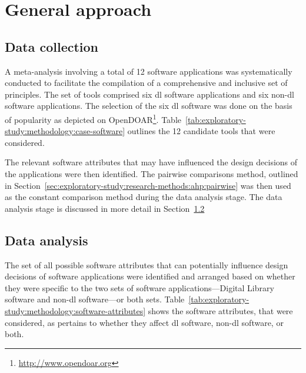 \section{General approach}
\label{sec:exploratory-study:methodology}

\subsection{Data collection}
\label{sec:exploratory-study:methodology:case-software-tools}

A meta-analysis involving a total of 12 software applications
was systematically conducted to facilitate the compilation of a comprehensive
and inclusive set of principles. The set of tools comprised six
\gls{dl} software applications and six non-\gls{dl}
software applications. The selection of the six \gls{dl} software
was done on the basis of popularity as depicted on
OpenDOAR\footnote{\url{http://www.opendoar.org}}. Table~\ref{tab:exploratory-study:methodology:case-software} outlines the 12 candidate tools that were considered.

The relevant software attributes that may have influenced the design decisions
of the applications were then identified. The pairwise comparisons method,
outlined in Section~\ref{sec:exploratory-study:research-methods:ahp:pairwise} was then used as
the constant comparison method during the data analysis stage. The data
analysis stage is discussed in more detail in Section~\ref{sec:exploratory-study:methodology:data-analysis}


\tablespacing

\bodyspacing

\subsection{Data analysis}
\label{sec:exploratory-study:methodology:data-analysis}

The set of all possible software attributes that can potentially influence
design decisions of software applications were identified and arranged based on
whether they were specific to the two sets of software applications---Digital
Library software and non-\gls{dl} software---or both sets. Table~\ref{tab:exploratory-study:methodology:software-attributes} shows the
software attributes, that were considered,  as pertains to whether they affect
\gls{dl} software, non-\gls{dl} software, or both.

